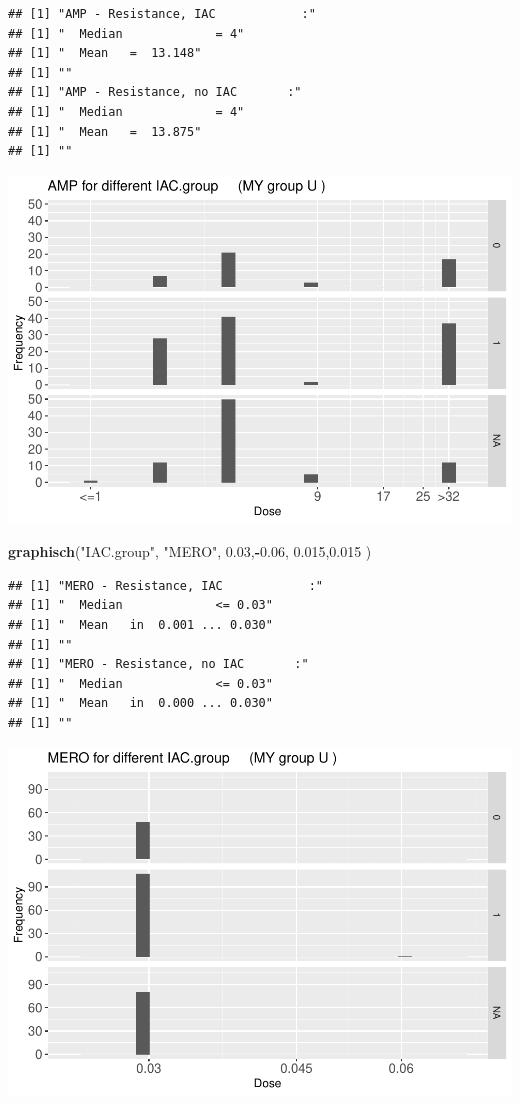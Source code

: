 \documentclass[
]{article}
\newenvironment{Shaded}{\begin{snugshade}}{\end{snugshade}}
\newcommand{\FloatTok}[1]{\textcolor[rgb]{0.00,0.00,0.81}{#1}}
\newcommand{\KeywordTok}[1]{\textcolor[rgb]{0.13,0.29,0.53}{\textbf{#1}}}
\newcommand{\NormalTok}[1]{#1}
\newcommand{\OperatorTok}[1]{\textcolor[rgb]{0.81,0.36,0.00}{\textbf{#1}}}
\newcommand{\StringTok}[1]{\textcolor[rgb]{0.31,0.60,0.02}{#1}}
\begin{document}
\begin{verbatim}
## [1] "AMP - Resistance, IAC            :"
## [1] "  Median             = 4"
## [1] "  Mean   =  13.148"
## [1] ""
## [1] "AMP - Resistance, no IAC       :"
## [1] "  Median             = 4"
## [1] "  Mean   =  13.875"
## [1] ""
\end{verbatim}

\includegraphics{Verteilungen_files/figure-latex/unnamed-chunk-5-1.pdf}

\begin{Shaded}
\begin{Highlighting}[]
  \KeywordTok{graphisch}\NormalTok{(}\StringTok{"IAC.group"}\NormalTok{, }\StringTok{"MERO"}\NormalTok{, }\FloatTok{0.03}\NormalTok{,}\OperatorTok{-}\FloatTok{0.06}\NormalTok{,   }\FloatTok{0.015}\NormalTok{,}\FloatTok{0.015}\NormalTok{ )}
\end{Highlighting}
\end{Shaded}

\begin{verbatim}
## [1] "MERO - Resistance, IAC            :"
## [1] "  Median             <= 0.03"
## [1] "  Mean   in  0.001 ... 0.030"
## [1] ""
## [1] "MERO - Resistance, no IAC       :"
## [1] "  Median             <= 0.03"
## [1] "  Mean   in  0.000 ... 0.030"
## [1] ""
\end{verbatim}

\includegraphics{Verteilungen_files/figure-latex/unnamed-chunk-6-1.pdf}
\end{document}
